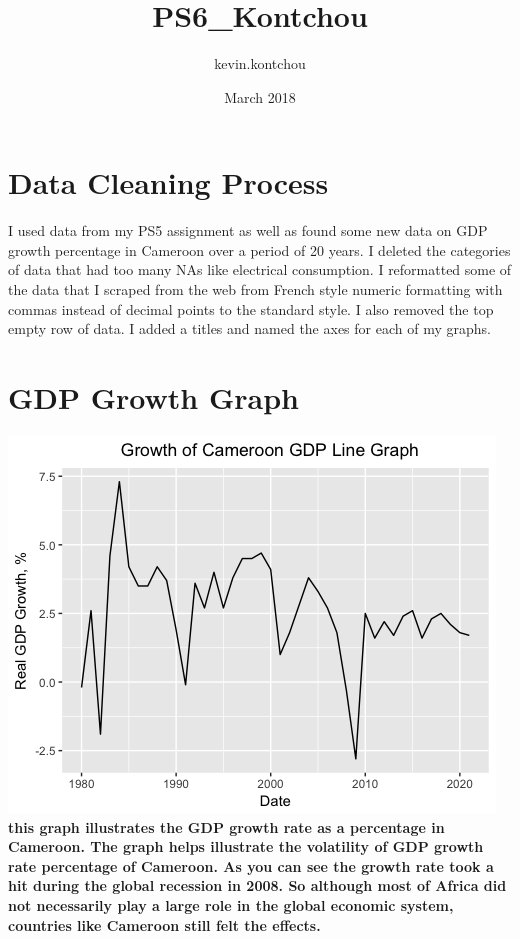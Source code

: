 \documentclass{article}
\title{PS6_Kontchou}
\author{kevin.kontchou }
\date{March 2018}
\begin{document}
\maketitle

\section{Data Cleaning Process}
{I used data from my PS5 assignment as well as found some new data on GDP growth percentage in Cameroon over a period of 20 years. I deleted the categories of data that had too many NAs like electrical consumption. I reformatted some of the data that I scraped from the web from French style numeric formatting with commas instead of decimal points to the standard style. I also removed the top empty row of data. I added a titles and named the axes for each of my graphs.}

\textbf{}

\section{GDP Growth Graph}
\includegraphics[height = 6cm width = 7cm]{RplotCamLineGraph}
\textbf{this graph illustrates the GDP growth rate as a percentage in Cameroon. The graph helps illustrate the volatility of GDP growth rate percentage of Cameroon. As you can see the growth rate took a hit during the global recession in 2008. So although most of Africa did not necessarily play a large role in the global economic system, countries like Cameroon still felt the effects.}
\end{document}
